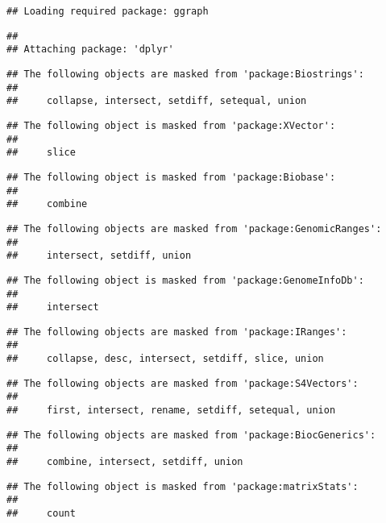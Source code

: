 \documentclass[
  oneside]{book}
\begin{document}
\begin{verbatim}
## Loading required package: ggraph
\end{verbatim}

\begin{verbatim}
## 
## Attaching package: 'dplyr'
\end{verbatim}

\begin{verbatim}
## The following objects are masked from 'package:Biostrings':
## 
##     collapse, intersect, setdiff, setequal, union
\end{verbatim}

\begin{verbatim}
## The following object is masked from 'package:XVector':
## 
##     slice
\end{verbatim}

\begin{verbatim}
## The following object is masked from 'package:Biobase':
## 
##     combine
\end{verbatim}

\begin{verbatim}
## The following objects are masked from 'package:GenomicRanges':
## 
##     intersect, setdiff, union
\end{verbatim}

\begin{verbatim}
## The following object is masked from 'package:GenomeInfoDb':
## 
##     intersect
\end{verbatim}

\begin{verbatim}
## The following objects are masked from 'package:IRanges':
## 
##     collapse, desc, intersect, setdiff, slice, union
\end{verbatim}

\begin{verbatim}
## The following objects are masked from 'package:S4Vectors':
## 
##     first, intersect, rename, setdiff, setequal, union
\end{verbatim}

\begin{verbatim}
## The following objects are masked from 'package:BiocGenerics':
## 
##     combine, intersect, setdiff, union
\end{verbatim}

\begin{verbatim}
## The following object is masked from 'package:matrixStats':
## 
##     count
\end{verbatim}
\end{document}
